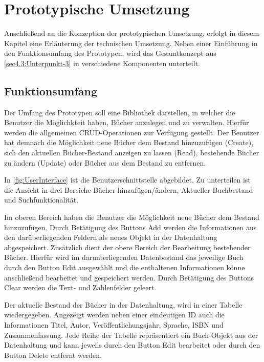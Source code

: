 \chapter{Prototypische Umsetzung\label{chap5:Fuenftes-Kapitel}}

Anschließend an die Konzeption der prototypischen Umsetzung, erfolgt in diesem Kapitel eine Erläuterung der technischen Umsetzung. Neben einer Einführung in den Funktionsumfang des Prototypen, wird das Gesamtkonzept aus \autoref{sec4.3:Unterpunkt-3} in verschiedene Komponenten unterteilt.


\section{Funktionsumfang\label{sec5.1:Unterpunkt-1}}

Der Umfang des Prototypen soll eine Bibliothek darstellen, in welcher die Benutzer die Möglichkteit haben, Bücher anzulegen und zu verwalten. Hierfür werden die allgemeinen CRUD-Operationen zur Verfügung gestellt. Der Benutzer hat demnach die Möglichkeit neue Bücher dem Bestand hinzuzufügen (Create), sich den aktuellen Bücher-Bestand anzeigen zu lassen (Read), bestehende Bücher zu ändern (Update) oder Bücher aus dem Bestand zu entfernen.

In \autoref{fig:UserInterface} ist die Benutzerschnittstelle abgebildet. Zu unterteilen ist die Ansicht in drei Bereiche \glqq Bücher hinzufügen/ändern\grqq{}, \glqq Aktueller Buchbestand\grqq{} und \glqq Suchfunktionalität\grqq{}.

Im oberen Bereich haben die Benutzer die Möglichkeit neue Bücher dem Bestand hinzuzufügen. Durch Betätigung des Buttons \glqq Add\grqq{} werden die Informationen aus den darüberliegenden Feldern als neues Objekt in der Datenhaltung abgespeichert. Zusätzlich dient der obere Bereich der Bearbeitung bestehender Bücher. Hierfür wird im darunterliegenden Datenbestand das jeweilige Buch durch den Button \glqq Edit\grqq{} ausgewählt und die enthaltenen Informationen könne anschließend bearbeitet und gespeichert werden. Durch Betätigung des Buttons \glqq Clear\grqq{} werden die Text- und Zahlenfelder geleert.

Der aktuelle Bestand der Bücher in der Datenhaltung, wird in einer Tabelle wiedergegeben. Angezeigt werden neben einer eindeutigen ID auch die Informationen  Titel, Autor, Veröffentlichungsjahr, Sprache, ISBN und Zusammenfassung. Jede Reihe der Tabelle repräsentiert ein Buch-Objekt aus der Datenhaltung und kann jeweils durch den Button \glqq Edit\grqq{} bearbeitet oder durch den Button \glqq Delete\grqq{} entfernt werden.


